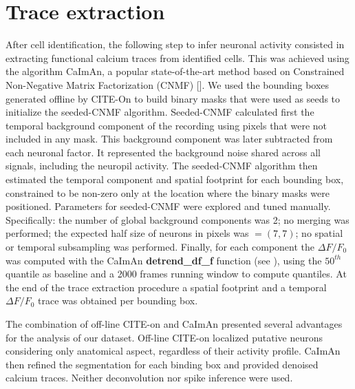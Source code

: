 \section{Trace extraction}
\label{chap3:sec:5:trace_extraction}
After cell identification, the following step to infer neuronal activity consisted in extracting functional calcium traces from identified cells. 
This was achieved using the algorithm CaImAn, a popular state-of-the-art method based on Constrained Non-Negative Matrix Factorization (CNMF) [\cite{giovannucci2019}].
We used the bounding boxes generated offline by CITE-On to build binary masks that were used as seeds to initialize the seeded-CNMF algorithm.
Seeded-CNMF calculated first the temporal background component of the recording using pixels that were not included in any mask. This background component was later subtracted from each neuronal factor. 
It represented the background noise shared across all signals, including the neuropil activity.
The seeded-CNMF algorithm then estimated the temporal component and spatial footprint for each bounding box, constrained to be non-zero only at the location where the binary masks were positioned.
Parameters for seeded-CNMF were explored and tuned manually. Specifically: the number of global background components was 2; no merging was performed; the expected half size of neurons in pixels was $= (7,7)$; no spatial or temporal subsampling was performed.
Finally, for each component the $\Delta F/F_0$ was computed with the CaImAn \textbf{detrend\_df\_f} function (see \cite{giovannucci2019}), using the $50^{th}$ quantile as baseline and a 2000 frames running window to compute quantiles.
At the end of the trace extraction procedure a spatial footprint and a temporal $\Delta F/F_0$ trace was obtained per bounding box.

The combination of off-line CITE-on and CaImAn presented several advantages for the analysis of our dataset.
Off-line CITE-on localized putative neurons considering only anatomical aspect, regardless of their activity profile.
CaImAn then refined the segmentation for each binding box and provided denoised calcium traces. 
Neither deconvolution nor spike inference were used. 
